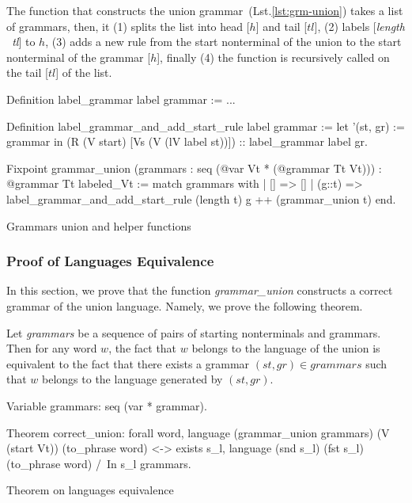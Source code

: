 The function that constructs the union grammar~(Lst.\ref{lst:grm-union}) takes a list of grammars, then, it (1) splits the list into head [$h$] and tail [$tl$], (2) labels [\textit{length \ tl}] to $h$, (3) adds a new rule from the start nonterminal of the union to the start nonterminal of the grammar [$h$], finally (4) the function is recursively called on the tail [$tl$] of the list.

\begin{listing}[h]
    \begin{pyglist}[language=coq, numbers=none, numbersep=5pt]
  Definition label_grammar label grammar := ...

  Definition label_grammar_and_add_start_rule 
               label 
               grammar :=
    let '(st, gr) := grammar in 
    (R (V start) [Vs (V (lV label st))]) 
       :: label_grammar label gr.        

  Fixpoint grammar_union 
     (grammars : seq (@var Vt * (@grammar Tt Vt)))
       : @grammar 
     Tt 
     labeled_Vt :=
    match grammars with
    |  [] => []
    |  (g::t) => 
         label_grammar_and_add_start_rule 
           (length t) 
           g ++ (grammar_union t)
    end.
    \end{pyglist}
    \caption{Grammars union and helper functions}
    \label{lst:grm-union}
\end{listing}

\subsubsection{Proof of Languages Equivalence}

In this section, we prove that the function \textit{grammar\_union} constructs a correct grammar of the union language. Namely, we prove the following theorem.

\begin{theorem} \label{theorem-correct-union}
    Let \textit{grammars} be a sequence of pairs of starting nonterminals and grammars. Then for any word $w$, the fact that $w$ belongs to the language of the union is equivalent to the fact that there exists a grammar $(st,gr) \in \textit{grammars}$ such that $w$ belongs to the language generated by $(st,gr)$.
\end{theorem}

\begin{listing}[h]
    \begin{pyglist}[language=coq, numbers=none, numbersep=5pt]
  Variable grammars: seq (var * grammar).

  Theorem correct_union:
    forall word, 
      language (grammar_union grammars) 
        (V (start Vt)) (to_phrase word) <->
      exists s_l, 
        language (snd s_l) (fst s_l) 
          (to_phrase word) /\ 
        In s_l grammars.
    \end{pyglist}
    \caption{Theorem on languages equivalence}
    \label{lst:lang-eq}
\end{listing}


